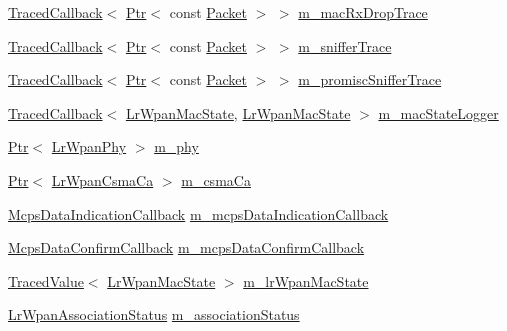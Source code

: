 \begin{DoxyCompactItemize}
\item 
\hyperlink{classns3_1_1TracedCallback}{Traced\+Callback}$<$ \hyperlink{classns3_1_1Ptr}{Ptr}$<$ const \hyperlink{classns3_1_1Packet}{Packet} $>$ $>$ \hyperlink{classns3_1_1LrWpanMac_ac06545ba350f6e2bc5d771213875bdf6}{m\+\_\+mac\+Rx\+Drop\+Trace}
\item 
\hyperlink{classns3_1_1TracedCallback}{Traced\+Callback}$<$ \hyperlink{classns3_1_1Ptr}{Ptr}$<$ const \hyperlink{classns3_1_1Packet}{Packet} $>$ $>$ \hyperlink{classns3_1_1LrWpanMac_a8940ff6f40ddf5d73e5c550cb0317729}{m\+\_\+sniffer\+Trace}
\item 
\hyperlink{classns3_1_1TracedCallback}{Traced\+Callback}$<$ \hyperlink{classns3_1_1Ptr}{Ptr}$<$ const \hyperlink{classns3_1_1Packet}{Packet} $>$ $>$ \hyperlink{classns3_1_1LrWpanMac_a39b7fdffc860b187b9f316d78127d51f}{m\+\_\+promisc\+Sniffer\+Trace}
\item 
\hyperlink{classns3_1_1TracedCallback}{Traced\+Callback}$<$ \hyperlink{group__lr-wpan_ga02ee7efd682937a8781f5e6101f61884}{Lr\+Wpan\+Mac\+State}, \hyperlink{group__lr-wpan_ga02ee7efd682937a8781f5e6101f61884}{Lr\+Wpan\+Mac\+State} $>$ \hyperlink{classns3_1_1LrWpanMac_a7545ecfb4bdf7436739d00507872d248}{m\+\_\+mac\+State\+Logger}
\item 
\hyperlink{classns3_1_1Ptr}{Ptr}$<$ \hyperlink{classns3_1_1LrWpanPhy}{Lr\+Wpan\+Phy} $>$ \hyperlink{classns3_1_1LrWpanMac_ae3184afcbda99342d45c0b7e6cf9f33a}{m\+\_\+phy}
\item 
\hyperlink{classns3_1_1Ptr}{Ptr}$<$ \hyperlink{classns3_1_1LrWpanCsmaCa}{Lr\+Wpan\+Csma\+Ca} $>$ \hyperlink{classns3_1_1LrWpanMac_a03fc5a3a267a984f8ec0ba62ff9da270}{m\+\_\+csma\+Ca}
\item 
\hyperlink{group__lr-wpan_ga1635d218f83c7d0107b268080efd317b}{Mcps\+Data\+Indication\+Callback} \hyperlink{classns3_1_1LrWpanMac_ada2124716389b849b2a1f9c8ff64d597}{m\+\_\+mcps\+Data\+Indication\+Callback}
\item 
\hyperlink{group__lr-wpan_ga00a61304d3d1c08a4fa8ae483f960001}{Mcps\+Data\+Confirm\+Callback} \hyperlink{classns3_1_1LrWpanMac_a05eba7a98d1cbbf86151290069e093e0}{m\+\_\+mcps\+Data\+Confirm\+Callback}
\item 
\hyperlink{classns3_1_1TracedValue}{Traced\+Value}$<$ \hyperlink{group__lr-wpan_ga02ee7efd682937a8781f5e6101f61884}{Lr\+Wpan\+Mac\+State} $>$ \hyperlink{classns3_1_1LrWpanMac_ab5cdfd39de7397d658d300961dab3ed0}{m\+\_\+lr\+Wpan\+Mac\+State}
\item 
\hyperlink{group__lr-wpan_ga807185d7d6ea3364bd69c73e4095af30}{Lr\+Wpan\+Association\+Status} \hyperlink{classns3_1_1LrWpanMac_a62c6c8e144e58da7b67dbf862b6cd15d}{m\+\_\+association\+Status}

\end{DoxyCompactItemize}

